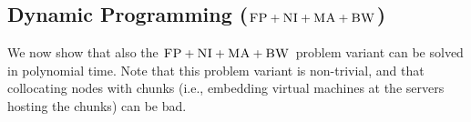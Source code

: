 \documentclass[9pt]{sigcomm-alternate}
\newcommand{\VirtualNode}{v}
\newcommand{\achunk}{\ensuremath{c}}
\newcommand{\CC}{\textsc{NI}}
\newcommand{\FP}{\textsc{FP}}
\newcommand{\RS}{\textsc{RS}}
\newcommand{\BW}{\textsc{BW}}
\newcommand{\MA}{\textsc{MA}}
\begin{document}

\subsection{Dynamic Programming ($\FP+\CC+\MA+\BW$)}\label{ssec:dyn}

We now show that also the $\FP+\CC+\MA+\BW$ problem variant can be solved
in polynomial time. Note that this problem variant is non-trivial,
and that collocating nodes with chunks (i.e., embedding virtual machines
at the servers hosting the chunks) can be bad.
\end{document}
